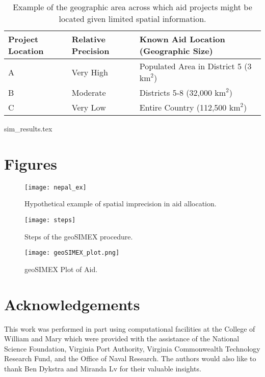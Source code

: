 \newpage
\begin{table}[!htbp]
	\begin{tabular}{| l | l | l |}
	\hline
	Project Location & Relative Precision & Known Aid Location (Geographic Size)\\
    \hline
    A &  Very High & Populated Area in District 5 (3 $\text{km}^2$) \\ \hline
    B &  Moderate & Districts 5-8 (32,000 $\text{km}^2$) \\ \hline
    C &  Very Low & Entire Country (112,500 $\text{km}^2$) \\ \hline
	\end{tabular}
	\caption{Example of the geographic area across which aid projects might be located given limited spatial information.}\label{precision_example}
\end{table}

\newpage
{sim_results.tex}

\newpage


\newpage

\section{Figures}

\begin{figure}[!htbp]
\texttt{[image: nepal\_ex]}
\caption{Hypothetical example of spatial imprecision in aid allocation.}\label{fig:nepalex}
\end{figure}

\begin{figure}[!htbp]
\texttt{[image: steps]}
\caption{Steps of the geoSIMEX procedure.}\label{fig:steps}
\end{figure}


\begin{figure}[!htbp]
\texttt{[image: geoSIMEX\_plot.png]}
\caption{geoSIMEX Plot of Aid.}\label{fig:geoSIMEX_plot}
\end{figure}

\newpage

\section{Acknowledgements}
This work was performed in part using computational facilities at the College of William and Mary which were provided with the assistance of the National Science Foundation, Virginia Port Authority, Virginia Commonwealth Technology Research Fund, and the Office of Naval Research. 
The authors would also like to thank Ben Dykstra and Miranda Lv for their valuable insights.
\newpage

\printbibliography


